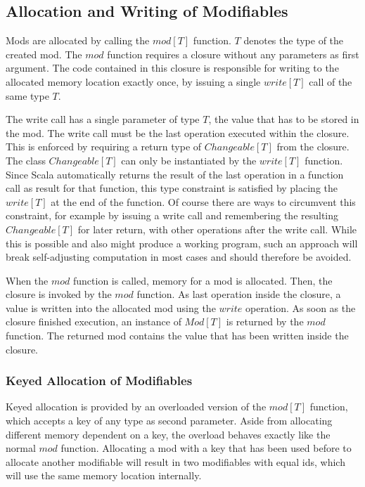 \subsection{Allocation and Writing of Modifiables}
\label{sec:allocation}

Mods are allocated by calling the $mod[T]$ function. $T$ denotes the type of the created mod. The $mod$ function requires a closure without any parameters as first argument. The code contained in this closure is responsible for writing to the allocated memory location exactly once, by issuing a single $write[T]$ call of the same type $T$. 

The write call has a single parameter of type $T$, the value that has to be stored in the mod.
The write call must be the last operation executed within the closure. This is enforced by requiring a return type of $Changeable[T]$ from the closure. The class $Changeable[T]$ can only be instantiated by the $write[T]$ function. Since Scala automatically returns the result of the last operation in a function call as result for that function, this type constraint is satisfied by placing the $write[T]$ at the end of the function. Of course there are ways to circumvent this constraint, for example by issuing a write call and remembering the resulting $Changeable[T]$ for later return, with other operations after the write call. While this is possible and also might produce a working program, such an approach will break self-adjusting computation in most cases and should therefore be avoided.

When the $mod$ function is called, memory for a mod is allocated. Then, the closure is invoked by the $mod$ function. As last operation inside the closure, a value is written into the allocated mod using the $write$ operation. As soon as the closure finished execution, an instance of $Mod[T]$ is returned by the $mod$ function. The returned mod contains the value that has been written inside the closure. 

\subsubsection{Keyed Allocation of Modifiables}
\label{sec:keyed_alloc_tbd}

 Keyed allocation is provided by an overloaded version of the $mod[T]$ function, which accepts a key of any type as second parameter. Aside from allocating different memory dependent on a key, the overload behaves exactly like the normal $mod$ function. Allocating a mod with a key that has been used before to allocate another modifiable will result in two modifiables with equal ids, which will use the same memory location internally. 

